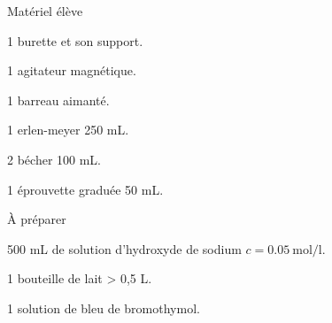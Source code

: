 
\begin{boiteMateriel}{Matériel élève}
  \effectifTerminaleStss

  \begin{listePoints}
    \item 1 burette et son support.
    \item 1 agitateur magnétique.
    \item 1 barreau aimanté.
    \item 1 erlen-meyer 250 mL.
    \item 2 bécher 100 mL.
    \item 1 éprouvette graduée 50 mL.
  \end{listePoints}
\end{boiteMateriel}

\begin{boiteMateriel}{À préparer}
  \begin{listePoints}
    \item 500 mL de solution d'hydroxyde de sodium $c = \qty{0,05}{\mol\per\litre}$.
    \item 1 bouteille de lait > 0,5 L.
    \item 1 solution de bleu de bromothymol.
  \end{listePoints}
\end{boiteMateriel}